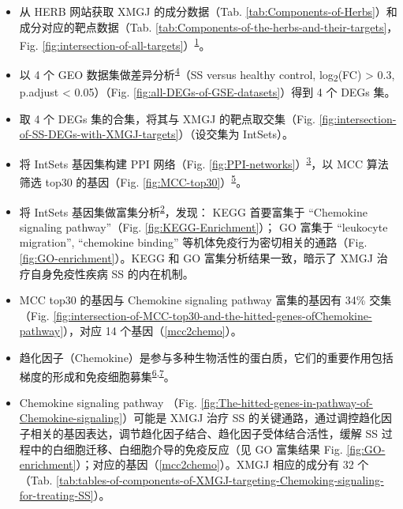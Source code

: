 \documentclass[
]{article}
\providecommand{\tightlist}{%
  \setlength{\itemsep}{0pt}\setlength{\parskip}{0pt}}
\begin{document}
\begin{itemize}
\tightlist
\item
  从 HERB 网站获取 XMGJ 的成分数据（Tab. \ref{tab:Components-of-Herbs}）和成分对应的靶点数据（Tab. \ref{tab:Components-of-the-herbs-and-their-targets}，Fig. \ref{fig:intersection-of-all-targets}）\textsuperscript{\protect\hyperlink{ref-HerbAHighThFang2021}{1}}。
\item
  以 4 个 GEO 数据集做差异分析\textsuperscript{\protect\hyperlink{ref-LimmaPowersDiRitchi2015}{4}}（SS versus healthy control, \textbar log\textsubscript{2}(FC)\textbar{} \textgreater{} 0.3, p.adjust \textless{} 0.05）（Fig. \ref{fig:all-DEGs-of-GSE-datasets}）得到 4 个 DEGs 集。
\item
  取 4 个 DEGs 集的合集，将其与 XMGJ 的靶点取交集（Fig. \ref{fig:intersection-of-SS-DEGs-with-XMGJ-targets}）（设交集为 IntSets）。
\item
  将 IntSets 基因集构建 PPI 网络（Fig. \ref{fig:PPI-networks}）\textsuperscript{\protect\hyperlink{ref-TheStringDataSzklar2021}{3}}，以 MCC 算法筛选 top30 的基因（Fig. \ref{fig:MCC-top30}）\textsuperscript{\protect\hyperlink{ref-CytohubbaIdenChin2014}{5}}。
\item
  将 IntSets 基因集做富集分析\textsuperscript{\protect\hyperlink{ref-ClusterprofilerWuTi2021}{2}}，发现： KEGG 首要富集于 ``Chemokine signaling pathway''（Fig. \ref{fig:KEGG-Enrichment}）； GO 富集于 ``leukocyte migration'', ``chemokine binding'' 等机体免疫行为密切相关的通路（Fig. \ref{fig:GO-enrichment}）。KEGG 和 GO 富集分析结果一致，暗示了 XMGJ 治疗自身免疫性疾病 SS 的内在机制。
\item
  MCC top30 的基因与 Chemokine signaling pathway 富集的基因有 34\% 交集（Fig. \ref{fig:intersection-of-MCC-top30-and-the-hitted-genes-ofChemokine-pathway}），对应 14 个基因（\ref{mcc2chemo}）。
\item
  趋化因子（Chemokine）是参与多种生物活性的蛋白质，它们的重要作用包括梯度的形成和免疫细胞募集\textsuperscript{\protect\hyperlink{ref-TheChemokineLCecchi2023}{6},\protect\hyperlink{ref-ChemokineHeterBlanch2023}{7}}。
\item
  Chemokine signaling pathway （Fig. \ref{fig:The-hitted-genes-in-pathway-of-Chemokine-signaling}）可能是 XMGJ 治疗 SS 的关键通路，通过调控趋化因子相关的基因表达，调节趋化因子结合、趋化因子受体结合活性，缓解 SS 过程中的白细胞迁移、白细胞介导的免疫反应（见 GO 富集结果 Fig. \ref{fig:GO-enrichment}）；对应的基因（\ref{mcc2chemo}）。XMGJ 相应的成分有 32 个（Tab. \ref{tab:tables-of-components-of-XMGJ-targeting-Chemoking-signaling-for-treating-SS}）。
\end{itemize}
\end{document}
